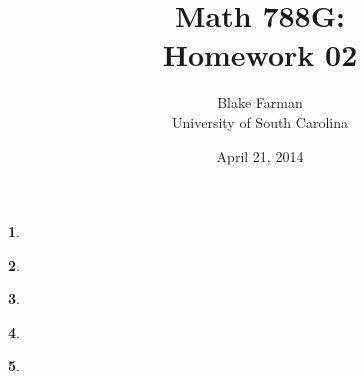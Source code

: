 \documentclass[10pt]{amsart}
\author{Blake Farman\\University of South Carolina}
\title{Math 788G:\\Homework 02}
\date{April 21, 2014}
\begin{document}
\maketitle

\providecommand{\Tr}[2]{\operatorname{Tr}_{#1}\left(#2\right)}
\providecommand{\p}{\mathfrak{p}}
\providecommand{\m}{\mathfrak{m}}
\providecommand{\Deck}[1]{\operatorname{Deck}\left(#1\right)}
\newtheorem{thm}{}
\newtheorem{lem}{Lemma}
\newtheorem{prop}{Proposition}
\theoremstyle{definition}
\newtheorem{defn}{Definition}[thm]

\newcommand{\A}{\mathbb{A}}

\begin{thm}\label{Ex1}
\end{thm}

\begin{thm}\label{Ex2}
\end{thm}

\begin{thm}\label{Ex3}
\end{thm}

\begin{thm}\label{Ex4}
\end{thm}

\begin{thm}\label{Ex5}
\end{thm}
\end{document}
